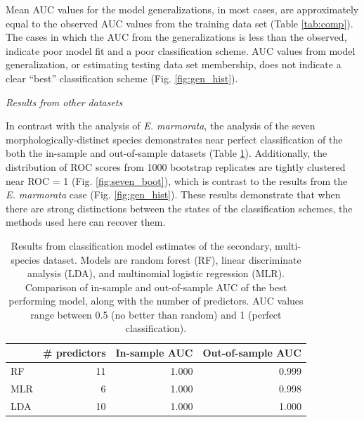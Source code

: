 \documentclass[12pt,letterpaper]{article}
\renewcommand{\subsection}[1]{%
\bigskip
\begin{center}
\begin{large}
\normalfont\itshape #1
\end{large}
\end{center}}
\begin{document}
Mean AUC values for the model generalizations, in most cases, are approximately equal to the observed AUC values from the training data set (Table \ref{tab:comp}). The  cases in which the AUC from the  generalizations is less than the observed, indicate poor model fit and a poor classification scheme. AUC values from model generalization, or estimating testing data set membership, does not indicate a clear ``best'' classification scheme (Fig. \ref{fig:gen_hist}). 


\subsection{Results from other datasets}

In contrast with the analysis of \textit{E. marmorata}, the analysis of the seven morphologically-distinct species demonstrates near perfect classification of the both the in-sample and out-of-sample datasets (Table \ref{tab:second_res}). Additionally, the distribution of ROC scores from 1000 bootstrap replicates are tightly clustered near ROC = 1 (Fig. \ref{fig:seven_boot}), which is contrast to the results from the \textit{E. marmorata} case (Fig. \ref{fig:gen_hist}). These results demonstrate that when there are strong distinctions between the states of the classification schemes, the methods used here can recover them.

\begin{table}[ht]
  \centering
  \caption{Results from classification model estimates of the secondary, multi-species dataset. Models are random forest (RF), linear discriminate analysis (LDA), and multinomial logistic regression (MLR). Comparison of in-sample and out-of-sample AUC of the best performing model, along with the number of predictors. AUC values range between 0.5 (no better than random) and 1 (perfect classification).}
  \begin{tabular}{ l r r r }
    \hline
    & \# predictors & In-sample AUC & Out-of-sample AUC \\ 
    \hline
    \hline
    RF &   11 & 1.000 & 0.999 \\ 
    MLR &    6 & 1.000 & 0.998 \\ 
    LDA &   10 & 1.000 & 1.000 \\ 
    \hline
  \end{tabular}
  \label{tab:second_res}
\end{table}
\end{document}
